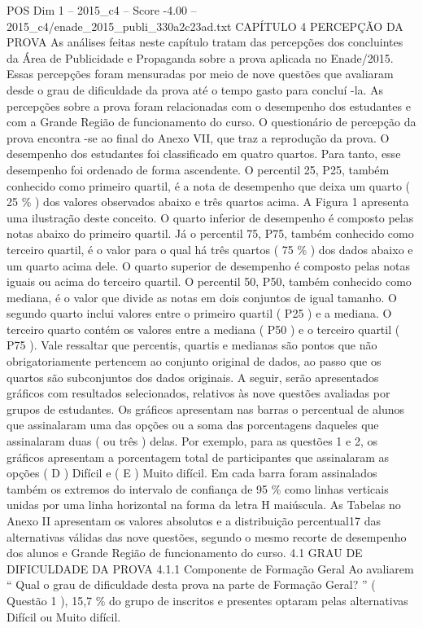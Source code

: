 \begin{textsample}{POS Dim 1 – 2015\_c4 – Score -4.00 – 2015\_c4/enade\_2015\_publi\_330a2c23ad.txt}  \label{ex:f1_pos_339}
CAPÍTULO 4 PERCEPÇÃO DA PROVA As análises feitas neste capítulo tratam das percepções dos concluintes da Área de Publicidade e Propaganda sobre a prova aplicada no Enade/2015.
Essas percepções foram mensuradas por meio de nove questões que avaliaram desde o grau de dificuldade da prova até o tempo gasto para concluí -la.
As percepções sobre a prova foram relacionadas com o desempenho dos estudantes e com a Grande Região de funcionamento do curso.
O questionário de percepção da prova encontra -se ao final do Anexo VII, que traz a reprodução da prova.
O desempenho dos estudantes foi classificado em quatro quartos.
Para tanto, esse desempenho foi ordenado de forma ascendente.
O percentil 25, P25, também conhecido como primeiro quartil, é a nota de desempenho que deixa um quarto ( 25 \% ) dos valores observados abaixo e três quartos acima.
A Figura 1 apresenta uma ilustração deste conceito.
O quarto inferior de desempenho é composto pelas notas abaixo do primeiro quartil.
Já o percentil 75, P75, também conhecido como terceiro quartil, é o valor para o qual há três quartos ( 75 \% ) dos dados abaixo e um quarto acima dele.
O quarto superior de desempenho é composto pelas notas iguais ou acima do terceiro quartil.
O percentil 50, P50, também conhecido como mediana, é o valor que divide as notas em dois conjuntos de igual tamanho.
O segundo quarto inclui valores entre o primeiro quartil ( P25 ) e a mediana.
O terceiro quarto contém os valores entre a mediana ( P50 ) e o terceiro quartil ( P75 ).
Vale ressaltar que percentis, quartis e medianas são pontos que não obrigatoriamente pertencem ao conjunto original de dados, ao passo que os quartos são subconjuntos dos dados originais.
A seguir, serão apresentados gráficos com resultados selecionados, relativos às nove questões avaliadas por grupos de estudantes.
Os gráficos apresentam nas barras o percentual de alunos que assinalaram uma das opções ou a soma das porcentagens daqueles que assinalaram duas ( ou três ) delas.
Por exemplo, para as questões 1 e 2, os gráficos apresentam a porcentagem total de participantes que assinalaram as opções ( D ) Difícil e ( E ) Muito difícil.
Em cada barra foram assinalados também os extremos do intervalo de confiança de 95 \% como linhas verticais unidas por uma linha horizontal na forma da letra H maiúscula.
As Tabelas no Anexo II apresentam os valores absolutos e a distribuição percentual17 das alternativas válidas das nove questões, segundo o mesmo recorte de desempenho dos alunos e Grande Região de funcionamento do curso. 4.1 GRAU DE DIFICULDADE DA PROVA 4.1.1 Componente de Formação Geral Ao avaliarem “ Qual o grau de dificuldade desta prova na parte de Formação Geral? ” ( Questão 1 ), 15,7 \% do grupo de inscritos e presentes optaram pelas alternativas Difícil ou Muito difícil.

\end{textsample}
